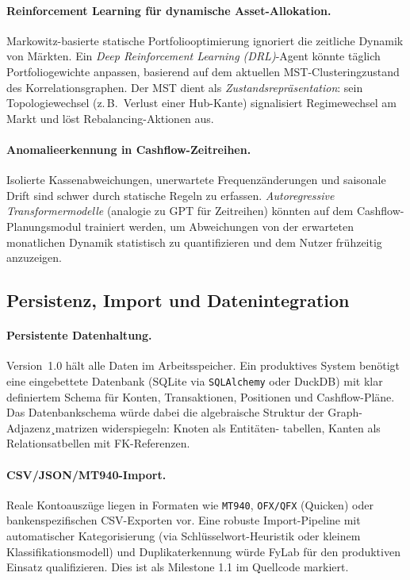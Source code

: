 \documentclass[a4paper,12pt]{article}
\begin{document}
\paragraph{Reinforcement Learning für dynamische Asset-Allokation.}
Markowitz-basierte statische Portfoliooptimierung ignoriert die zeitliche
Dynamik von Märkten. Ein \emph{Deep Reinforcement Learning (DRL)}-Agent
könnte täglich Portfoliogewichte anpassen, basierend auf dem aktuellen
MST-Clusteringzustand des Korrelationsgraphen. Der MST dient als
\emph{Zustandsrepräsentation}: sein Topologiewechsel (z.\,B.\ Verlust einer
Hub-Kante) signalisiert Regimewechsel am Markt und löst Rebalancing-Aktionen
aus.

\paragraph{Anomalieerkennung in Cashflow-Zeitreihen.}
Isolierte Kassenabweichungen, unerwartete Frequenzänderungen und saisonale
Drift sind schwer durch statische Regeln zu erfassen. \emph{Autoregressive
Transformermodelle} (analogie zu GPT für Zeitreihen) könnten auf dem
Cashflow-Planungsmodul trainiert werden, um Abweichungen von der erwarteten
monatlichen Dynamik statistisch zu quantifizieren und dem Nutzer
frühzeitig anzuzeigen.

\subsection{Persistenz, Import und Datenintegration}
\label{sub:ausblick_daten}

\paragraph{Persistente Datenhaltung.}
Version~1.0 hält alle Daten im Arbeitsspeicher. Ein produktives System
benötigt eine eingebettete Datenbank (SQLite via \texttt{SQLAlchemy} oder
DuckDB) mit klar definiertem Schema für Konten, Transaktionen, Positionen
und Cash\-flow-Pläne. Das Datenbankschema würde dabei die algebraische
Struktur der Graph-Adjazenz\-¸matrizen widerspiegeln: Knoten als Entitäten-
tabellen, Kanten als Relationsatbellen mit FK-Referenzen.

\paragraph{CSV/JSON/MT940-Import.}
Reale Kontoauszüge liegen in Formaten wie \texttt{MT940},
\texttt{OFX/QFX} (Quicken) oder bankenspezifischen CSV-Exporten vor.
Eine robuste Import-Pipeline mit automatischer Kategorisierung
(via Schlüsselwort-Heuristik oder kleinem Klassifikationsmodell)
und Duplikaterkennung würde FyLab für den produktiven Einsatz
qualifizieren. Dies ist als Milestone 1.1 im Quellcode markiert.
\end{document}
